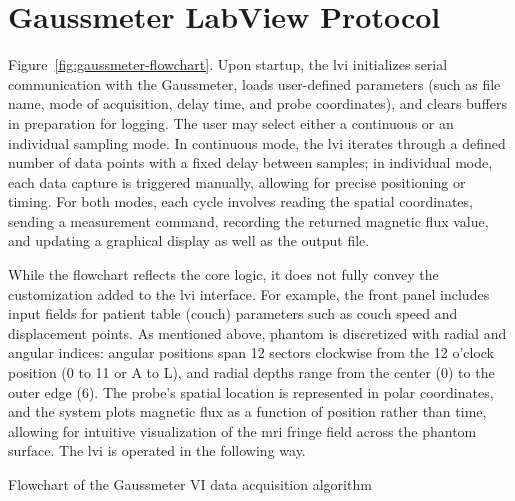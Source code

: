 \section{Gaussmeter LabView Protocol}
\label{app:LabView}

Figure~\ref{fig:gaussmeter-flowchart}. Upon startup, the \gls{lvi} initializes serial communication with the Gaussmeter, loads user-defined parameters (such as file name, mode of acquisition, delay time, and probe coordinates), and clears buffers in preparation for logging. The user may select either a continuous or an individual sampling mode. In continuous mode, the \gls{lvi} iterates through a defined number of data points with a fixed delay between samples; in individual mode, each data capture is triggered manually, allowing for precise positioning or timing. For both modes, each cycle involves reading the spatial coordinates, sending a measurement command, recording the returned magnetic flux value, and updating a graphical display as well as the output file.

While the flowchart reflects the core logic, it does not fully convey the customization added to the \gls{lvi} interface. For example, the front panel includes input fields for patient table (couch) parameters such as couch speed and displacement points. As mentioned above, phantom is discretized with radial and angular indices: angular positions span 12 sectors clockwise from the 12 o’clock position (0 to 11 or A to L), and radial depths range from the center (0) to the outer edge (6). The probe’s spatial location is represented in polar coordinates, and the system plots magnetic flux as a function of position rather than time, allowing for intuitive visualization of the \gls{mri} fringe field across the phantom surface.
The \gls{lvi} is operated in the following way.

Flowchart of the Gaussmeter VI data acquisition algorithm

\label{fig:gaussmeter-flowchart}